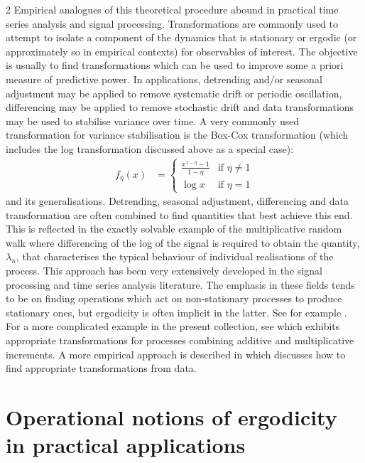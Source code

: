 \documentclass[11pt]{article}
\begin{document}
\begin{multicols}{2}
Empirical analogues of this theoretical procedure abound in practical time series analysis and signal processing.
Transformations are commonly used to attempt to isolate a component of the dynamics that is stationary or ergodic (or approximately so in empirical contexts) for observables of interest.
The objective is usually to find transformations which can be used to improve some a priori measure of predictive power.
In applications, detrending and/or seasonal adjustment may be applied to remove systematic drift or periodic oscillation, differencing may be applied to remove stochastic drift and data transformations may be used to stabilise variance over time.
A very commonly used transformation for variance stabilisation is the Box-Cox transformation (which includes the log transformation discussed above as a special case):
\begin{align}
f_\eta(x) &=
\left\{
\begin{array}{ll}
\frac{x^{1-\eta} -1}{1- \eta} & \text{if $\eta \neq 1$} \\
 \log x &  \text{if $\eta = 1$}
\end{array}
\right.
\end{align}
and its generalisations. 
Detrending, seasonal adjustment, differencing and data transformation are often combined to find quantities that best achieve this end.
This is reflected in the exactly solvable example of the multiplicative random walk where differencing of the log of the signal is required to obtain the quantity, $\lambda_n$, that characterises the typical behaviour of individual realisations of the process.
This approach has been very extensively developed in the signal processing and time series analysis literature.
The emphasis in these fields tends to be on finding operations which act on non-stationary processes to produce stationary ones, but ergodicity is often implicit in the latter.
See for example \cite{durbin2012time}. 
For a more complicated example in the present collection, see \cite{RodriguezRaposoCoelloPulido_ErgodicityTransformation} which exhibits appropriate transformations for processes combining additive and multiplicative increments. 
A more empirical approach is described in \cite{Britto_LikelihoodBasedEstimation} which discusses how to find appropriate transformations from data.


\section{Operational notions of ergodicity in practical applications }


\end{multicols}
\end{document}
